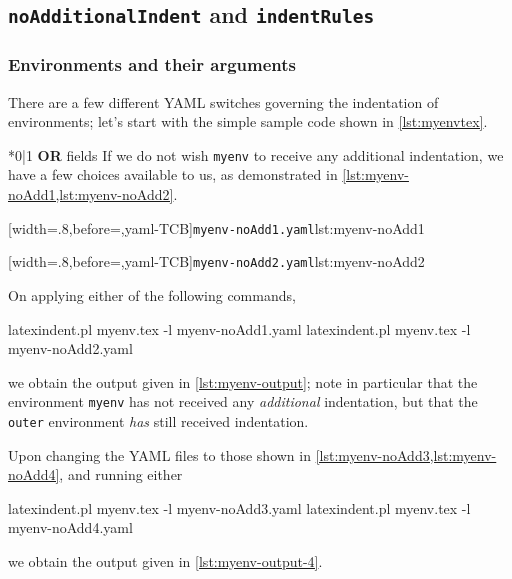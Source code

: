 \subsection{\texttt{noAdditionalIndent} and \texttt{indentRules}}
\subsubsection{Environments and their arguments}
There are a few different YAML switches governing the indentation of environments; let's start 
with the simple sample code shown in \cref{lst:myenvtex}.


*{0|1 {\bfseries OR} fields} 
If we do not wish \texttt{myenv} to receive any additional indentation, we have a few choices available to us, 
as demonstrated in \cref{lst:myenv-noAdd1,lst:myenv-noAdd2}.

\begin{minipage}{.45\textwidth}
[width=.8\linewidth,before=\centering,yaml-TCB]{\texttt{myenv-noAdd1.yaml}}{lst:myenv-noAdd1}
\end{minipage}
\hfill
\begin{minipage}{.45\textwidth}
[width=.8\linewidth,before=\centering,yaml-TCB]{\texttt{myenv-noAdd2.yaml}}{lst:myenv-noAdd2}
\end{minipage}

On applying either of the following commands,
\begin{commandshell}
latexindent.pl myenv.tex -l myenv-noAdd1.yaml  
latexindent.pl myenv.tex -l myenv-noAdd2.yaml  
\end{commandshell}
we obtain the output given in \cref{lst:myenv-output}; note in particular that the environment \texttt{myenv} 
has not received any \emph{additional} indentation, but that the \texttt{outer} environment \emph{has} still 
received indentation.


Upon changing the YAML files to those shown in \cref{lst:myenv-noAdd3,lst:myenv-noAdd4}, and running either
\begin{commandshell}
latexindent.pl myenv.tex -l myenv-noAdd3.yaml  
latexindent.pl myenv.tex -l myenv-noAdd4.yaml  
\end{commandshell}
we obtain the output given in \cref{lst:myenv-output-4}. 

